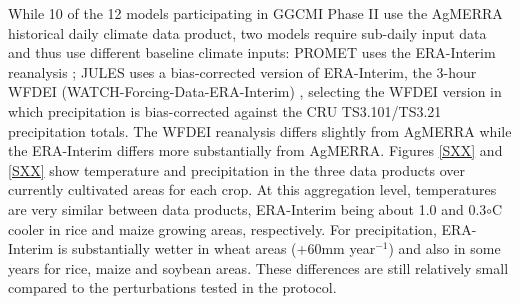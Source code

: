 \documentclass[gmd, manuscript]{copernicus} %
\begin{document}

While 10 of the 12 models participating in GGCMI Phase II use the AgMERRA historical daily climate data product, two models require sub-daily input data and thus use different baseline climate inputs:
PROMET uses the ERA-Interim reanalysis \citep{dee2011era}; JULES uses a bias-corrected version of ERA-Interim, the 3-hour WFDEI (WATCH-Forcing-Data-ERA-Interim) \citep{weedon2014wfdei}, selecting the WFDEI version in which precipitation is bias-corrected against the CRU TS3.101/TS3.21 precipitation totals\citep{harris_cru_2014}.
The WFDEI reanalysis differs slightly from AgMERRA while the ERA-Interim differs more substantially from AgMERRA. 
Figures \ref{SXX} and \ref{SXX} show temperature and precipitation in the three data products over currently cultivated areas for each crop. At this aggregation level, temperatures are very similar between data products, ERA-Interim being about 1.0 and 0.3$\circ$C cooler in rice and maize growing areas, respectively. 
For precipitation, ERA-Interim is substantially wetter in wheat areas (+60mm year$^{-1}$) and also in some years for rice, maize and soybean areas.
These differences are still relatively small compared to the perturbations tested in the protocol.
\end{document}

